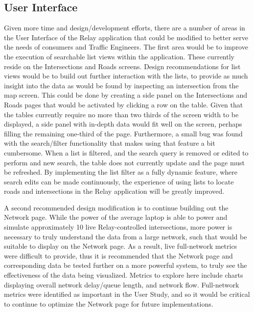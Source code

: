 \documentclass{report}
\begin{document}
\subsection{User Interface}
Given more time and design/development efforts, there are a number of areas in the User Interface of the Relay application that could be modified to better serve the needs of consumers and Traffic Engineers.
The first area would be to improve the execution of searchable list views within the application.
These currently reside on the Intersections and Roads screens.
Design recommendations for list views would be to build out further interaction with the lists, to provide as much insight into the data as would be found by inspecting an intersection from the map screen.
This could be done by creating a side panel on the Intersections and Roads pages that would be activated by clicking a row on the table.
Given that the tables currently require no more than two thirds of the screen width to be displayed, a side panel with in-depth data would fit well on the screen, perhaps filling the remaining one-third of the page.
Furthermore, a small bug was found with the search/filter functionality that makes using that feature a bit cumbersome.
When a list is filtered, and the search query is removed or edited to perform and new search, the table does not currently update and the page must be refreshed.
By implementing the list filter as a fully dynamic feature, where search edits can be made continuously, the experience of using lists to locate roads and intersections in the Relay application will be greatly improved.

A second recommended design modification is to continue building out the Network page.
While the power of the average laptop is able to power and simulate approximately 10 live Relay-controlled intersections, more power is necessary to truly understand the data from a large network, such that would be suitable to display on the Network page.
As a result, live full-network metrics were difficult to provide, thus it is recommended that the Network page and corresponding data be tested further on a more powerful system, to truly see the effectiveness of the data being visualized.
Metrics to explore here include charts displaying overall network delay/queue length, and network flow.
Full-network metrics were identified as important in the User Study, and so it would be critical to continue to optimize the Network page for future implementations.
\end{document}
